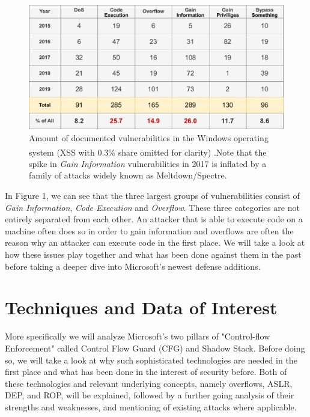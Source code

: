 \documentclass[10pt,twocolumn,a4paper]{article}
\begin{document}
\begin{figure}[h]
\centering
\includegraphics[keepaspectratio,width=\linewidth]{fig/cve}
\caption{Amount of documented vulnerabilities in the Windows operating system (XSS with 0.3\% share omitted for clarity) \textsuperscript{\cite{CVE}}.\newline Note that the spike in \emph{Gain Information} vulnerabilities in 2017 is inflated by a family of attacks widely known as Meltdown/Spectre.}
\end{figure}
\newpage
In Figure 1, we can see that the three largest groups of vulnerabilities consist of \emph{Gain Information}, \emph{Code Execution} and \emph{Overflow}.
These three categories are not entirely separated from each other.
An attacker that is able to execute code on a machine often does so in order to gain information and overflows are often the reason why an attacker can execute code in the first place.
We will take a look at how these issues play together and what has been done against them in the past before taking a deeper dive into Microsoft's newest defense additions.

\section{Techniques and Data of Interest}
More specifically we will analyze Microsoft's two pillars of "Control-flow Enforcement" called Control Flow Guard (CFG) and Shadow Stack.  Before doing so, we will take a look at why such sophisticated technologies are needed in the first place and what has been done in the interest of security before.
Both of these technologies and relevant underlying concepts, namely overflows, ASLR, DEP, and ROP, will be explained, followed by a further going analysis of their strengths and weaknesses, and mentioning of existing attacks where applicable.
\end{document}
